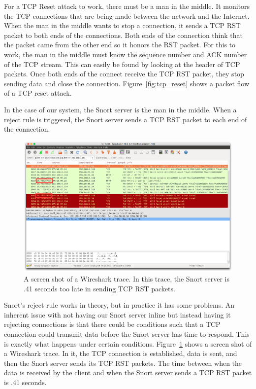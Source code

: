 For a TCP Reset attack to work, there must be a man in the middle. It monitors
the TCP connections that are being made between the network and the Internet.
When the man in the middle wants to stop a connection, it sends a TCP RST packet
to both ends of the connections. Both ends of the connection think that the
packet came from the other end so it honors the RST packet. For this to work,
the man in the middle must know the sequence number and ACK number of the TCP
stream. This can easily be found by looking at the header of TCP packets. Once
both ends of the connect receive the TCP RST packet, they stop sending data and
close the connection. Figure~\ref{fig:tcp_reset} shows a packet flow of a TCP
reset attack.

In the case of our system, the Snort server is the man in the middle. When a
reject rule is triggered, the Snort server sends a TCP RST packet to each end
of the connection.

\begin{figure}[!t]
    \centering
    \includegraphics[width=\columnwidth]{figures/snort_slow}
    \caption{A screen shot of a Wireshark trace. In this trace, the Snort
    server is .41 seconds too late in sending TCP RST packets.}
    \label{fig:snort_slow}
\end{figure}

Snort's reject rule works in theory, but in practice it has some problems. 
%
An inherent issue with not having our Snort server inline but instead having
it rejecting connections is that there could be conditions such that a TCP
connection could transmit data  before the Snort server has time to respond.
%
This is exactly what happens under certain conditions.
%
Figure~\ref{fig:snort_slow} shows a screen shot of a Wireshark trace.
%
In it, the TCP connection is established, data is sent, and then the Snort
server sends its TCP RST packets.
%
The time between when the data is received by the client and when the Snort
server sends a TCP RST packet is .41 seconds.

